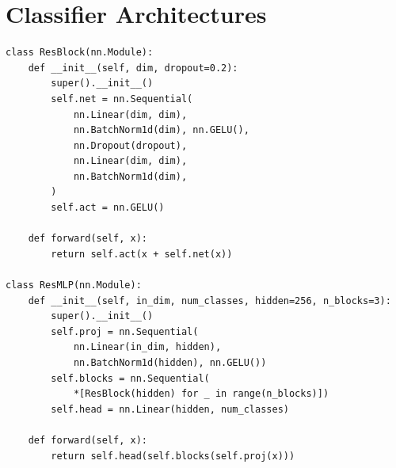 \section{Classifier Architectures}

\begin{lstlisting}[caption={ResMLP architecture with residual blocks.}, label={lst:resmlp_arch}]
class ResBlock(nn.Module):
    def __init__(self, dim, dropout=0.2):
        super().__init__()
        self.net = nn.Sequential(
            nn.Linear(dim, dim),
            nn.BatchNorm1d(dim), nn.GELU(),
            nn.Dropout(dropout),
            nn.Linear(dim, dim),
            nn.BatchNorm1d(dim),
        )
        self.act = nn.GELU()

    def forward(self, x):
        return self.act(x + self.net(x))

class ResMLP(nn.Module):
    def __init__(self, in_dim, num_classes, hidden=256, n_blocks=3):
        super().__init__()
        self.proj = nn.Sequential(
            nn.Linear(in_dim, hidden),
            nn.BatchNorm1d(hidden), nn.GELU())
        self.blocks = nn.Sequential(
            *[ResBlock(hidden) for _ in range(n_blocks)])
        self.head = nn.Linear(hidden, num_classes)

    def forward(self, x):
        return self.head(self.blocks(self.proj(x)))
\end{lstlisting}

